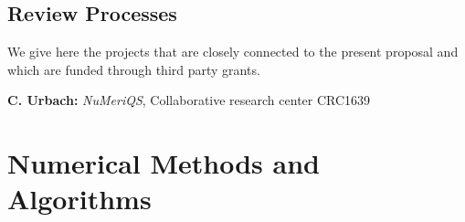 \documentclass [a4paper, 11pt]{article}
\begin{document}



\subsection{Review Processes}

We give here the projects that are closely connected to the present
proposal and which are funded through third party grants.

\textbf{C. Urbach:} \textit{NuMeriQS}, Collaborative research center CRC1639


\section{Numerical Methods and Algorithms} 
\end{document}
